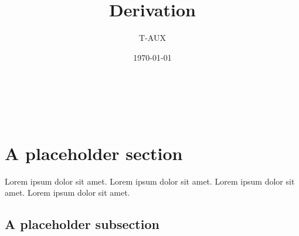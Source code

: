 \documentclass[titlepage,oneside,letterpaper,11pt]{article} %
\title{Derivation}
\author{T-AUX}
\date{\today}
\begin{document}
% 

\begin{center}
\makeatletter
{\color{MainColor}\LARGE\bfseries\@title}\\
{\large\@author}\\
{\large\@date}
\makeatother
\end{center}

{
\setlength{\parskip}{0ex}
\tableofcontents
}

% 


% 


\section{A placeholder section}

Lorem ipsum dolor sit amet. Lorem ipsum dolor sit amet. Lorem ipsum dolor sit amet. Lorem ipsum dolor sit amet.

\subsection{A placeholder subsection}
\end{document}
